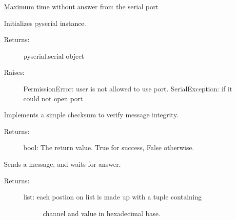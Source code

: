 \documentclass[letterpaper,10pt,english]{sphinxmanual}
\begin{document}
\begin{fulllineitems}
\begin{fulllineitems}
\end{fulllineitems}


\begin{fulllineitems}
\label{\detokenize{code:reimaginedQuantum.CommunicationPort.TIMEOUT}}
Maximum time without answer from the serial port

\end{fulllineitems}


\begin{fulllineitems}
\label{\detokenize{code:reimaginedQuantum.CommunicationPort.begin_serial}}
Initializes pyserial instance.
\begin{description}
\item[{Returns:}] \leavevmode
pyserial.serial object

\item[{Raises:}] \leavevmode
PermissionError: user is not allowed to use port.
SerialException: if it could not open port

\end{description}

\end{fulllineitems}


\begin{fulllineitems}
\label{\detokenize{code:reimaginedQuantum.CommunicationPort.checksum}}
Implements a simple checksum to verify message integrity.
\begin{description}
\item[{Returns:}] \leavevmode
bool: The return value. True for success, False otherwise.

\end{description}

\end{fulllineitems}


\begin{fulllineitems}
\label{\detokenize{code:reimaginedQuantum.CommunicationPort.message}}
Sends a message, and waits for answer.
\begin{description}
\item[{Returns:}] \leavevmode\begin{description}
\item[{list: each postion on list is made up with a tuple containing}] \leavevmode
channel and value in hexadecimal base.


\end{description}
\end{description}
\end{fulllineitems}
\end{fulllineitems}
\end{document}
